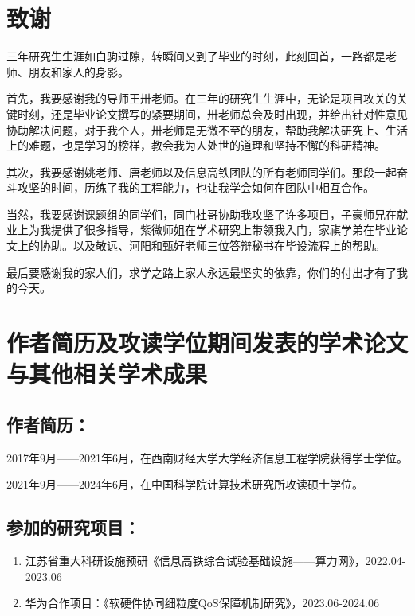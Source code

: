 \chapter[致谢]{致\quad 谢}%

三年研究生生涯如白驹过隙，转瞬间又到了毕业的时刻，此刻回首，一路都是老师、朋友和家人的身影。

首先，我要感谢我的导师王卅老师。在三年的研究生生涯中，无论是项目攻关的关键时刻，还是毕业论文撰写的紧要期间，卅老师总会及时出现，并给出针对性意见协助解决问题，对于我个人，卅老师是无微不至的朋友，帮助我解决研究上、生活上的难题，也是学习的榜样，教会我为人处世的道理和坚持不懈的科研精神。

其次，我要感谢姚老师、唐老师以及信息高铁团队的所有老师同学们。那段一起奋斗攻坚的时间，历练了我的工程能力，也让我学会如何在团队中相互合作。

当然，我要感谢课题组的同学们，同门杜哥协助我攻坚了许多项目，子豪师兄在就业上为我提供了很多指导，紫微师姐在学术研究上带领我入门，家祺学弟在毕业论文上的协助。以及敬远、河阳和甄好老师三位答辩秘书在毕设流程上的帮助。

最后要感谢我的家人们，求学之路上家人永远最坚实的依靠，你们的付出才有了我的今天。


\chapter{作者简历及攻读学位期间发表的学术论文与其他相关学术成果}

\section*{作者简历：}

2017年9月——2021年6月，在西南财经大学大学经济信息工程学院获得学士学位。

2021年9月——2024年6月，在中国科学院计算技术研究所攻读硕士学位。

\section*{参加的研究项目：}

\begin{enumerate}
    \item 江苏省重大科研设施预研《信息高铁综合试验基础设施——算力网》，2022.04-2023.06
    \item 华为合作项目：《软硬件协同细粒度QoS保障机制研究》，2023.06-2024.06
\end{enumerate}


\cleardoublepage[plain]%
